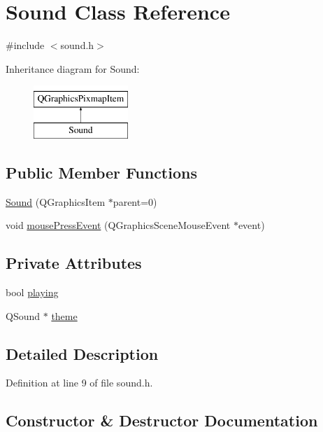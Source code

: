 \hypertarget{class_sound}{}\section{Sound Class Reference}
\label{class_sound}


{\ttfamily \#include $<$sound.\+h$>$}

Inheritance diagram for Sound\+:\begin{figure}[H]
\begin{center}
\leavevmode
\includegraphics[height=2.000000cm]{class_sound}
\end{center}
\end{figure}
\subsection*{Public Member Functions}
\begin{DoxyCompactItemize}
\item 
\hyperlink{class_sound_a7a36c00590d59181138f371c4cfbe988}{Sound} (Q\+Graphics\+Item $\ast$parent=0)
\item 
void \hyperlink{class_sound_aa145fbdd386c6614d0713802b5c03e07}{mouse\+Press\+Event} (Q\+Graphics\+Scene\+Mouse\+Event $\ast$event)
\end{DoxyCompactItemize}
\subsection*{Private Attributes}
\begin{DoxyCompactItemize}
\item 
bool \hyperlink{class_sound_a8651994f1462748b66bb224e4404c1c0}{playing}
\item 
Q\+Sound $\ast$ \hyperlink{class_sound_a65c0e423d9a706534ed44f4383b5abc1}{theme}
\end{DoxyCompactItemize}


\subsection{Detailed Description}


Definition at line 9 of file sound.\+h.



\subsection{Constructor \& Destructor Documentation}
\mbox{\label{class_sound_a7a36c00590d59181138f371c4cfbe988}} 
